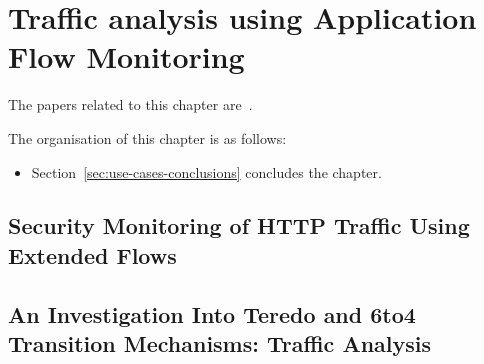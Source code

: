 \chapter{Traffic analysis using Application Flow Monitoring}\label{chap:traffic-analysis-using-application-flow-monitoring}

\begin{chapintro}

The papers related to this chapter are~\cite{Husak-2015-Security, Elich-2013-Investigation, Celeda-2013-Large, Hendriks-2017-Flow, Hendriks-2017-Threats, Velan-2016-Network}.

The organisation of this chapter is as follows:
\begin{itemize}
  \item Section~\ref{sec:use-cases-conclusions} concludes the chapter.
\end{itemize}

\end{chapintro}

\newpage

\section{Security Monitoring of HTTP Traffic Using Extended Flows}

\section{An Investigation Into Teredo and 6to4 Transition Mechanisms: Traffic Analysis}

